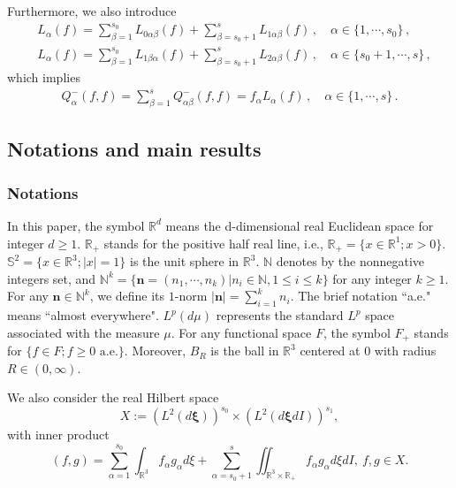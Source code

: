 \documentclass[reqno,11pt]{amsart}
\numberwithin{equation}{section}
\def\R{\mathbb{R}}
\begin{document}
Furthermore, we also introduce
\begin{equation}\label{L-alpha-def}
  \begin{aligned}
    & L_\alpha (f) = \sum_{\beta = 1}^{s_0} L_{0 \alpha \beta} (f) + \sum_{\beta = s_0 + 1}^{s} L_{1 \alpha \beta} (f) \,, \quad \alpha \in \{ 1, \cdots, s_0 \} \,, \\
    & L_\alpha (f) = \sum_{\beta = 1}^{s_0} L_{1 \beta \alpha} (f) + \sum_{\beta = s_0 + 1}^{s} L_{2 \alpha \beta} (f) \,, \quad \alpha \in \{s_0 + 1, \cdots, s \} \,,
  \end{aligned}
\end{equation}
which implies
\begin{equation}\label{Qn-alpha}
  \begin{aligned}
    Q_\alpha^- (f, f) = \sum_{\beta = 1}^{s} Q_{\alpha \beta}^- (f, f) = f_\alpha L_\alpha (f) \,, \quad \alpha \in \{ 1, \cdots, s \} \,.
  \end{aligned}
\end{equation}



\subsection{Notations and main results}
 
\subsubsection{Notations}

In this paper, the symbol $\R^d$ means the d-dimensional real Euclidean space for integer $d \geq 1$. $\R_+$ stands for the positive half real line, i.e., $\R_+ = \{ x \in \R^1; x > 0 \}$. $\mathbb{S}^2 = \{ x \in \R^3; |x| =1 \}$ is the unit sphere in $\R^3$. $\mathbb{N}$ denotes by the nonnegative integers set, and $\mathbb{N}^k = \{ \boldsymbol{n} = (n_1, \cdots, n_k) | n_i \in \mathbb{N}, 1 \leq i \leq k \}$ for any integer $k \geq 1$. For any $\boldsymbol{n} \in \mathbb{N}^k$, we define its $1$-norm $| \boldsymbol{n} | = \sum_{i=1}^{k} n_i$. The brief notation ``a.e." means ``almost everywhere". $L^p (d \mu)$ represents the standard $L^p$ space associated with the measure $\mu$. For any functional space $F$, the symbol $F_+$ stands for $\{ f \in F; f \geq 0 \textrm{ a.e.} \}$. Moreover, $B_R$ is the ball in $\R^3$ centered at $0$ with radius $R \in (0, \infty)$.
 
We also consider the real Hilbert space
\begin{equation*}
	X:=(L^2(d\mathbf{\xi }))^{s_0}\times (L^2(d\mathbf{\xi }dI))^{s_1},
\end{equation*}
with inner product
\begin{equation}\label{X-innerP}
	(f,g)= \sum \limits_{\alpha =1}^{s_0} \int_{ \R^3}f_\alpha g_\alpha d\xi + \sum \limits_{\alpha =s_0+1}^{s} \iint_{\R^3\times \R_+}f_\alpha g_\alpha d\xi dI,\ f,g \in X.
\end{equation}
\end{document}
